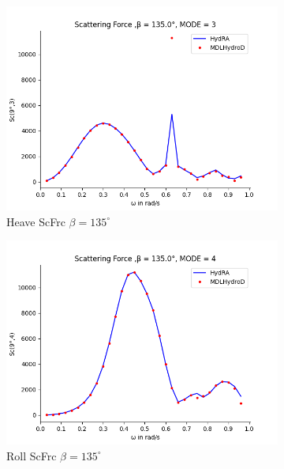 \begin{figure}[H]
    \vspace{5pt}%
    \begin{subfigure}[b]{0.45\textwidth}
        \includegraphics[width=\textwidth]{plots/kvlcc/sc/sc3.png}
        \caption{Heave ScFrc $\beta = 135^{\circ}$}
    \end{subfigure}
    \begin{subfigure}[b]{0.45\textwidth}
        \includegraphics[width=\textwidth]{plots/kvlcc/sc/sc4.png}
        \caption{Roll ScFrc $\beta = 135^{\circ}$}
    \end{subfigure}
    \vspace{5pt}%
    \begin{subfigure}[b]{0.45\textwidth}

\end{subfigure}
\end{figure}
